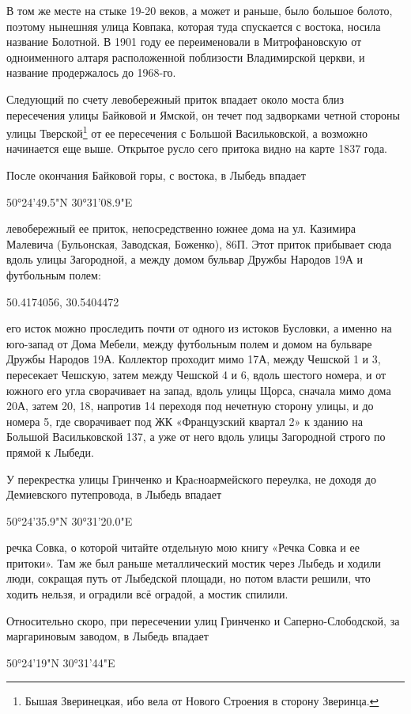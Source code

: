 В том же месте на стыке 19-20 веков, а может и раньше, было большое болото, поэтому нынешняя улица Ковпака, которая туда спускается с востока, носила название Болотной. В 1901 году ее переименовали в Митрофановскую от одноименного алтаря расположенной поблизости Владимирской церкви, и название продержалось до 1968-го.

Следующий по счету левобережный приток впадает около моста близ пересечения улицы Байковой и Ямской, он течет под задворками четной стороны улицы Тверской\footnote{Бышая Зверинецкая, ибо вела от Нового Строения в сторону Зверинца.} от ее пересечения с Большой Васильковской, а возможно начинается еще выше. Открытое русло сего притока видно на карте 1837 года.

После окончания Байковой горы, с востока, в Лыбедь впадает

50°24'49.5"N 30°31'08.9"E

левобережный ее приток, непосредственно южнее дома на ул. Казимира Малевича (Бульонская, Заводская, Боженко), 86П. Этот приток прибывает сюда вдоль улицы Загородной, а между домом бульвар Дружбы Народов 19А и футбольным полем:

50.4174056, 30.5404472

его исток можно проследить почти от одного из истоков Бусловки, а именно на юго-запад от Дома Мебели, между футбольным полем и домом на бульваре Дружбы Народов 19А. Коллектор проходит мимо 17А, между Чешской 1 и 3, пересекает Чешскую, затем между Чешской 4 и 6, вдоль шестого номера, и от южного его угла сворачивает на запад, вдоль улицы Щорса, сначала мимо дома 20А, затем 20, 18, напротив 14 переходя под нечетную сторону улицы, и до номера 5, где сворачивает под ЖК «Французский квартал 2» к зданию на Большой Васильковской 137, а уже от него вдоль улицы Загородной строго по прямой к Лыбеди.

У перекрестка улицы Гринченко и Краcноармейского переулка, не доходя до Демиевского путепровода, в Лыбедь впадает

50°24'35.9"N 30°31'20.0"E

речка Совка, о которой читайте отдельную мою книгу «Речка Совка и ее притоки». Там же был раньше металлический мостик через Лыбедь и ходили люди, сокращая путь от Лыбедской площади, но потом власти решили, что ходить нельзя, и оградили всё оградой, а мостик спилили.

Относительно скоро, при пересечении улиц Гринченко и Саперно-Сло\-бодской, за маргариновым заводом, в Лыбедь впадает

50°24'19"N 30°31'44"E

